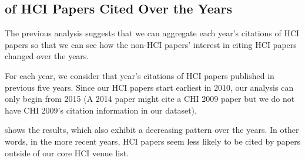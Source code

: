 
\subsection{\xin of HCI Papers Cited Over the Years}

The previous analysis suggests that we can aggregate each year's citations of HCI papers so that we can see how the non-HCI papers' interest in citing HCI papers changed over the years.

For each year, we consider that year's citations of HCI papers published in previous five years.
Since our HCI papers start earliest in 2010, our analysis can only begin from 2015 (A 2014 paper might cite a CHI 2009 paper but we do not have CHI 2009's citation information in our dataset).

 shows the results, which also exhibit a decreasing pattern over the years.
In other words, in the more recent years, HCI papers seem less likely to be cited by papers outside of our core HCI venue list.

